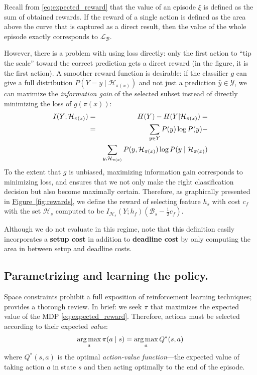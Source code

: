 Recall from \eqref{eq:expected_reward} that the value of an episode $\xi$ is defined as the sum of obtained rewards.
If the reward of a single action is defined as the area above the curve that is captured as a direct result, then the value of the whole episode exactly corresponds to $\mathcal{L}_\mathcal{B}$.

However, there is a problem with using loss directly: only the first action to ``tip the scale'' toward the correct prediction gets a direct reward (in the figure, it is the first action).  A smoother reward function is desirable:
if the classifier $g$ can give a full distribution $P(Y = y \mid \mathcal{H}_{\pi(x)})$ and not just a prediction $\hat{y} \in \mathcal{Y}$, we can maximize the \emph{information gain} of the selected subset instead of directly minimizing the loss of $g(\pi(x))$:
\begin{eqnarray}
I(Y; \mathcal{H}_{\pi(x)}) &=& H(Y) - H(Y | \mathcal{H}_{\pi(x)}) = \\ \notag
&=& \sum_{y \in Y} P(y) \log P(y) -  \\ \notag
&&\sum_{y, \mathcal{H}_{\pi(x)}} P(y, \mathcal{H}_{\pi(x)}) \log P(y \mid \mathcal{H}_{\pi(x)})
\end{eqnarray}
To the extent that $g$ is unbiased, maximizing information gain corresponds to minimizing loss, and ensures that we not only make the right classification decision but also become maximally certain.
Therefore, as graphically presented in \hyperref[fig:rewards]{Figure~\ref*{fig:rewards}}, we define the reward of selecting feature $h_s$ with cost $c_f$ with the set $\mathcal{H}_s$ computed to be $I_{\mathcal{H}_s}(Y; h_f) (\mathcal{B}_s - \frac{1}{2}c_f)$.

Although we do not evaluate in this regime, note that this definition easily incorporates a \textbf{setup cost} in addition to \textbf{deadline cost} by only computing the area in between setup and deadline costs.

\subsection{Parametrizing and learning the policy.}

Space constraints prohibit a full exposition of reinforcement learning techniques; \parencite{Sutton1998} provides a thorough review.
In brief: we seek $\pi$ that maximizes the expected value of the MDP \eqref{eq:expected_reward}.
Therefore, actions must be selected according to their expected \emph{value}:
\begin{align*}
\operatorname*{arg\,max}_a \pi(a \mid s) = \operatorname*{arg\,max}_a Q^*(s,a)
\end{align*}
where $Q^*(s,a)$ is the optimal \emph{action-value function}---the expected value of taking action $a$ in state $s$ and then acting optimally to the end of the episode.

